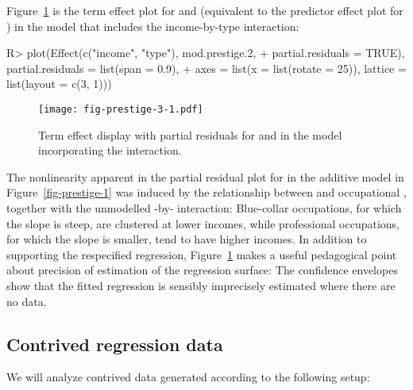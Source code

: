 \documentclass[article]{jss}
\newcommand{\smsp}{\nobreak\hspace{.08333em plus .00333em}}
\newcommand{\acb}[2]{#1\smsp{}:\smsp{}#2}
\begin{document}
Figure~\ref{fig-prestige-3} is the term effect plot for 
and  (equivalent to the predictor effect plot for
) in the model that includes the income-by-type
interaction:
%
\begin{Schunk}
\begin{Sinput}
R> plot(Effect(c("income", "type"), mod.prestige.2,
+    partial.residuals = TRUE), partial.residuals = list(span = 0.9),
+    axes = list(x = list(rotate = 25)), lattice = list(layout = c(3, 1)))
\end{Sinput}
\end{Schunk}
%
\begin{figure}[t!]
  \centering
    \texttt{[image: fig-prestige-3-1.pdf]}
  \caption{Term effect display with partial residuals for
     and  in the model incorporating the
    \code{\acb{income}{type}} interaction.}\label{fig-prestige-3}
\end{figure}
The nonlinearity apparent in the partial residual plot for  in the additive model in Figure~\ref{fig-prestige-1} was induced by the relationship between  and occupational , together with the unmodelled -by- interaction: Blue-collar occupations, for which the  slope is steep, are clustered at lower incomes, while professional occupations, for which the  slope is smaller, tend to have higher incomes. In addition to supporting the respecified regression, Figure~\ref{fig-prestige-3} makes a useful pedagogical point about precision of estimation of the regression surface: The confidence envelopes show that the fitted regression is sensibly imprecisely estimated where there are no data.

\pagebreak

\subsection{Contrived regression data}\label{sec-contrived-data}

We will analyze contrived data generated according to the following setup:
\end{document}
